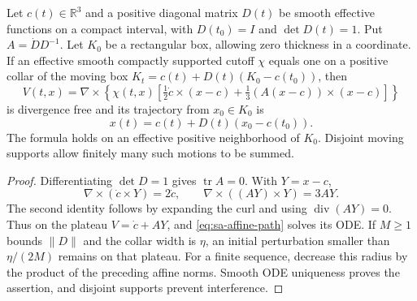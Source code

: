 \begin{lemma}\label{lem:sa-curl-motion}
Let $c(t)\in\mathbb R^3$ and a positive diagonal matrix $D(t)$ be smooth
effective functions on a compact interval, with $D(t_0)=I$ and
$\det D(t)=1$.  Put $A=\dot D D^{-1}$.  Let $K_0$ be a rectangular box, allowing
zero thickness in a coordinate.  If an effective smooth compactly supported
cutoff $\chi$ equals one on a
positive collar of the moving box $K_t=c(t)+D(t)(K_0-c(t_0))$, then
\begin{equation}\label{eq:sa-curl}
 V(t,x)=\nabla\times\left\{\chi(t,x)
 \left[\tfrac12\dot c\times(x-c)
       +\tfrac13(A(x-c))\times(x-c)\right]\right\}
\end{equation}
is divergence free and its trajectory from $x_0\in K_0$ is
\begin{equation}\label{eq:sa-affine-path}
 x(t)=c(t)+D(t)(x_0-c(t_0)).
\end{equation}
The formula holds on an effective positive neighborhood of $K_0$.
Disjoint moving supports allow finitely many such motions to be summed.
\end{lemma}
\begin{proof}
Differentiating $\det D=1$ gives $\operatorname{tr}A=0$.  With $Y=x-c$,
\[
 \nabla\times(\dot c\times Y)=2\dot c,\qquad
 \nabla\times((AY)\times Y)=3AY.
\]
The second identity follows by expanding the curl and using
$\operatorname{div}(AY)=0$.  Thus on the plateau $V=\dot c+AY$, and
\eqref{eq:sa-affine-path} solves its ODE.  If $M\ge1$ bounds $\|D\|$ and
the collar width is $\eta$, an initial perturbation smaller than
$\eta/(2M)$ remains on that plateau.  For a finite sequence, decrease
this radius by the product of the preceding affine norms.  Smooth ODE
uniqueness proves the assertion, and disjoint supports prevent interference.
\end{proof}

